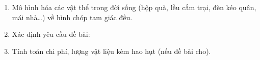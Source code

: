 \begin{enumerate}
\item Mô hình hóa các vật thể trong đời sống (hộp quà, lều cắm trại, đèn kéo quân, mái nhà\dots) về hình chóp tam giác đều.
\item Xác định yêu cầu đề bài:
\item Tính toán chi phí, lượng vật liệu kèm hao hụt (nếu đề bài cho).
\end{enumerate}
